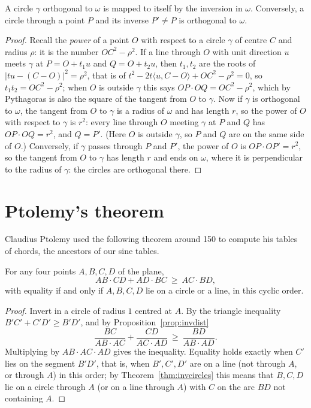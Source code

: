 \begin{proposition}\label{prop:orthfixed}
A circle $\gamma$ orthogonal to $\omega$ is mapped to itself by the inversion in $\omega$. Conversely, a circle through a point $P$ and its
inverse $P'\ne P$ is orthogonal to $\omega$.
\end{proposition}
\begin{proof}
Recall the \emph{power} of a point $O$ with respect to a circle $\gamma$ of centre $C$ and radius $\rho$: it is the number $OC^2-\rho^2$. If a line
through $O$ with unit direction $u$ meets $\gamma$ at $P=O+t_1u$ and $Q=O+t_2u$, then $t_1,t_2$ are the roots of $|tu-(C-O)|^2=\rho^2$, that is of
$t^2-2t\langle u,C-O\rangle+OC^2-\rho^2=0$, so $t_1t_2=OC^2-\rho^2$; when $O$ is outside $\gamma$ this says $OP\cdot OQ=OC^2-\rho^2$, which by Pythagoras is
also the square of the tangent from $O$ to $\gamma$. Now if $\gamma$ is orthogonal to $\omega$, the tangent from $O$ to $\gamma$ is a radius of $\omega$
and has length $r$, so the power of $O$ with respect to $\gamma$ is $r^2$: every line through $O$ meeting $\gamma$ at $P$ and $Q$ has $OP\cdot OQ=r^2$, and $Q=P'$. (Here $O$ is outside
$\gamma$, so $P$ and $Q$ are on the same side of $O$.) Conversely, if $\gamma$ passes through $P$ and $P'$, the power of $O$ is $OP\cdot OP'=r^2$,
so the tangent from $O$ to $\gamma$ has length $r$ and ends on $\omega$, where it is perpendicular to the radius of $\gamma$: the circles are
orthogonal there.
\end{proof}

\section{Ptolemy's theorem}

Claudius Ptolemy used the following theorem around 150 to compute his tables of chords, the ancestors of our sine tables.

\begin{theorem}\label{thm:ptolemy}
For any four points $A,B,C,D$ of the plane,
\[
AB\cdot CD+AD\cdot BC\ \ge\ AC\cdot BD,
\]
with equality if and only if $A,B,C,D$ lie on a circle or a line, in this cyclic order.
\end{theorem}
\begin{proof}
Invert in a circle of radius $1$ centred at $A$. By the triangle inequality $B'C'+C'D'\ge B'D'$, and by Proposition~\ref{prop:invdist}
\[
\frac{BC}{AB\cdot AC}+\frac{CD}{AC\cdot AD}\ \ge\ \frac{BD}{AB\cdot AD}.
\]
Multiplying by $AB\cdot AC\cdot AD$ gives the inequality. Equality holds exactly when $C'$ lies on the segment $B'D'$, that is, when $B',C',D'$
are on a line (not through $A$, or through $A$) in this order; by Theorem~\ref{thm:invcircles} this means that $B,C,D$ lie on a circle through
$A$ (or on a line through $A$) with $C$ on the arc $BD$ not containing $A$.
\end{proof}

